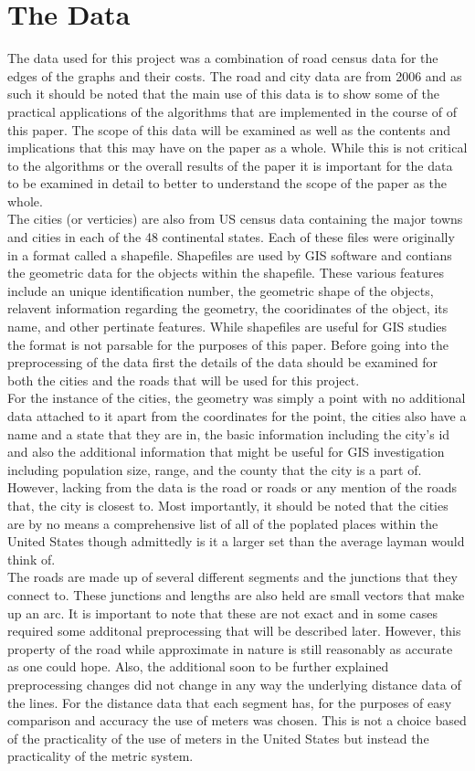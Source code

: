 \documentclass[midd]{thesis}
\newcommand{\tab}{\hspace*{2em}}
\begin{document}
\section{The Data}
\tab The data used for this project was a combination of road census data for the edges of the graphs and their costs. The road and city data are from 2006 and as such it should be noted that the main use of this data is to show some of the practical applications of the algorithms that are implemented in the course of of this paper. The scope of this data will be examined as well as the contents and implications that this may have on the paper as a whole. While this is not critical to the algorithms or the overall results of the paper it is important for the data to be examined in detail to better to understand the scope of the paper as the whole.\\
\tab The cities (or verticies) are also from US census data containing the major towns and cities in each of the 48 continental states.  Each of these files were originally in a format called a shapefile. Shapefiles are used by GIS software and contians the geometric data for the objects within the shapefile. These various features include an unique identification number, the geometric shape of the objects, relavent information regarding the geometry, the cooridinates of the object, its name, and other pertinate features. While shapefiles are useful for GIS studies the format is not parsable for the purposes of this paper. Before going into the preprocessing of the data first the details of the data should be examined for both the cities and the roads that will be used for this project.\\
\tab For the instance of the cities, the geometry was simply a point with no additional data attached to it apart from the coordinates for the point, the cities also have a name and a state that they are in, the basic information including the city's id and also the additional information that might be useful for GIS investigation including population size, range, and the county that the city is a part of. However, lacking from the data is the road or roads or any mention of the roads that, the city is closest to. Most importantly, it should be noted that the cities are by no means a comprehensive list of all of the poplated places within the United States though admittedly is it a larger set than the average layman would think of.\\
\tab The roads are made up of several different segments and the junctions that they connect to. These junctions and lengths are also held are small vectors that make up an arc. It is important to note that these are not exact and in some cases required some additonal preprocessing that will be described later. However, this property of the road while approximate in nature is still reasonably as accurate as one could hope. Also, the additional soon to be further explained preprocessing changes did not change in any way the underlying distance data of the lines. For the distance data that each segment has, for the purposes of easy comparison and accuracy the use of meters was chosen. This is not a choice based of the practicality of the use of meters in the United States but instead the practicality of the metric system.\\
\end{document}

